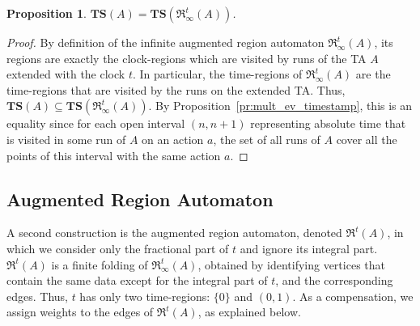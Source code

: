 \documentclass[11pt]{amsart}
\newtheorem{proposition}[theorem]{Proposition}
\theoremstyle{definition}
\newcommand{\ARRR}{\mathfrak{R}^t}
\newcommand{\IARRR}{\mathfrak{R}_{\infty}^{t}}
\newcommand{\TTTSSS}{\mathbf{TS}}
\begin{document}
\begin{proposition}
	\label{prop:eq_timestamp}
	$\TTTSSS(A) = \TTTSSS(\IARRR(A))$.
\end{proposition}
\begin{proof}
	By definition of the infinite augmented region automaton $\IARRR(A)$, its regions are exactly the clock-regions which are visited by runs of the TA $A$ extended with the clock $t$.
	In particular, the time-regions of $\IARRR(A)$ are the time-regions that are visited by the runs on the extended TA.
	Thus, $\TTTSSS(A) \subseteq \TTTSSS(\IARRR(A))$.
	By Proposition~\ref{pr:mult_ev_timestamp}, this is an equality since for each open interval $(n,n+1)$ representing absolute time that is visited in some run of $A$ on an action $a$, the set of all runs of $A$ cover all the points of this interval with the same action $a$.
\end{proof}
\subsection{Augmented Region Automaton}
A second construction is the augmented region automaton, denoted $\ARRR(A)$, in which we consider only the fractional part of $t$ and ignore its integral part.
$\ARRR(A)$ is a finite folding of $\IARRR(A)$, obtained by identifying vertices that contain the same data except for the integral part of $t$, and the corresponding edges. Thus, $t$ has only two time-regions: $\{0\}$ and $(0,1)$.
As a compensation, we assign weights to the edges of $\ARRR(A)$, as explained below.
\end{document}
